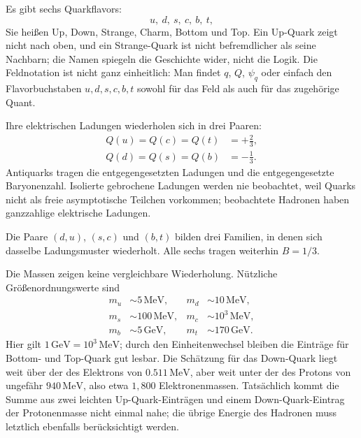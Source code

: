Es gibt sechs Quarkflavors:
\begin{equation}
u,\ d,\ s,\ c,\ b,\ t,
\end{equation}
Sie heißen Up, Down, Strange, Charm, Bottom und Top. Ein Up-Quark zeigt nicht nach oben, und ein Strange-Quark ist nicht befremdlicher als seine Nachbarn; die Namen spiegeln die Geschichte wider, nicht die Logik. Die Feldnotation ist nicht ganz einheitlich: Man findet \(q\), \(Q\), \(\psi_q\) oder einfach den Flavorbuchstaben \(u,d,s,c,b,t\) sowohl für das Feld als auch für das zugehörige Quant.

\begin{classroomqa}
\end{classroomqa}

Ihre elektrischen Ladungen wiederholen sich in drei Paaren:
\begin{equation}
\begin{aligned}
Q(u)=Q(c)=Q(t)&=+\frac23,
\\
Q(d)=Q(s)=Q(b)&=-\frac13.
\end{aligned}
\end{equation}
Antiquarks tragen die entgegengesetzten Ladungen und die entgegengesetzte Baryonenzahl. Isolierte gebrochene Ladungen werden nie beobachtet, weil Quarks nicht als freie asymptotische Teilchen vorkommen; beobachtete Hadronen haben ganzzahlige elektrische Ladungen.

Die Paare \((d,u)\), \((s,c)\) und \((b,t)\) bilden drei Familien, in denen sich dasselbe Ladungsmuster wiederholt. Alle sechs tragen weiterhin \(B=1/3\).

\begin{classroomqa}
\end{classroomqa}

Die Massen zeigen keine vergleichbare Wiederholung. Nützliche Größenordnungswerte sind
\begin{align}
m_u &\sim 5\,\mathrm{MeV},
&
m_d &\sim 10\,\mathrm{MeV},
\\
m_s &\sim 100\,\mathrm{MeV},
&
m_c &\sim 10^3\,\mathrm{MeV},
\\
m_b &\sim 5\,\mathrm{GeV},
&
m_t &\sim 170\,\mathrm{GeV}.
\end{align}
Hier gilt \(1\,\mathrm{GeV}=10^3\,\mathrm{MeV}\); durch den Einheitenwechsel bleiben die Einträge für Bottom- und Top-Quark gut lesbar. Die Schätzung für das Down-Quark liegt weit über der des Elektrons von \(0.511\,\mathrm{MeV}\), aber weit unter der des Protons von ungefähr \(940\,\mathrm{MeV}\), also etwa \(1{,}800\) Elektronenmassen. Tatsächlich kommt die Summe aus zwei leichten Up-Quark-Einträgen und einem Down-Quark-Eintrag der Protonenmasse nicht einmal nahe; die übrige Energie des Hadronen muss letztlich ebenfalls berücksichtigt werden.

